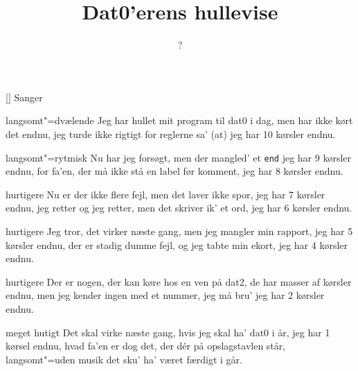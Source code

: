 \documentclass[a4paper,11pt]{article}
\title{Dat0'erens hullevise}
\author{?}
\begin{document}
\maketitle

\begin{roles}
[] Sanger
\end{roles}

\begin{song}
{\scene langsomt"=dvælende}
Jeg har hullet mit program til dat0 i dag,
men har ikke kørt det endnu,
jeg turde ikke rigtigt for reglerne sa'
(at) jeg har 10 kørsler endnu.

{\scene langsomt"=rytmisk}
Nu har jeg forsøgt, men der mangled' et {\tt end}
jeg har 9 kørsler endnu,
for fa'en, der må ikke stå en label før komment,
jeg har 8 kørsler endnu.

{\scene hurtigere}
Nu er der ikke flere fejl, men det laver ikke spor,
jeg har 7 kørsler endnu,
jeg retter og jeg retter, men det skriver ik' et ord,
jeg har 6 kørsler endnu.

{\scene hurtigere}
Jeg tror, det virker næste gang, men jeg mangler min rapport,
jeg har 5 kørsler endnu,
der er stadig dumme fejl, og jeg tabte min ekort,
jeg har 4 kørsler endnu.

{\scene hurtigere}
Der er nogen, der kan køre hos en ven på dat2,
de har masser af kørsler endnu,
men jeg kender ingen med et nummer, jeg må bru'
jeg har 2 kørsler endnu.

{\scene meget hutigt}
Det skal virke næste gang, hvis jeg skal ha' dat0 i år,
jeg har 1 kørsel endnu,
hvad fa'en er dog det, der dér på opslagstavlen står,
{\scene langsomt"=uden musik}
det sku' ha' været færdigt i går.
\end{song}
\end{document}
